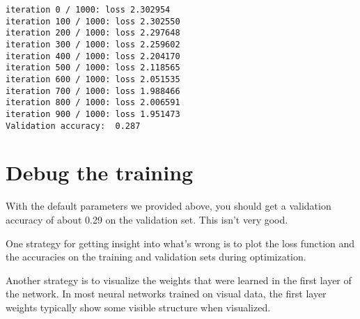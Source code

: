 \documentclass[11pt]{article}
\begin{document}
    \begin{Verbatim}[commandchars=\\\{\}]
iteration 0 / 1000: loss 2.302954
iteration 100 / 1000: loss 2.302550
iteration 200 / 1000: loss 2.297648
iteration 300 / 1000: loss 2.259602
iteration 400 / 1000: loss 2.204170
iteration 500 / 1000: loss 2.118565
iteration 600 / 1000: loss 2.051535
iteration 700 / 1000: loss 1.988466
iteration 800 / 1000: loss 2.006591
iteration 900 / 1000: loss 1.951473
Validation accuracy:  0.287
    \end{Verbatim}

    \hypertarget{debug-the-training}{%
\section{Debug the training}\label{debug-the-training}}

With the default parameters we provided above, you should get a
validation accuracy of about 0.29 on the validation set. This isn't very
good.

One strategy for getting insight into what's wrong is to plot the loss
function and the accuracies on the training and validation sets during
optimization.

Another strategy is to visualize the weights that were learned in the
first layer of the network. In most neural networks trained on visual
data, the first layer weights typically show some visible structure when
visualized.
\end{document}
